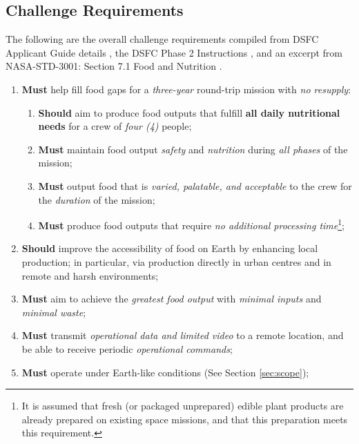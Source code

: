 \documentclass{../tex/report}
\begin{document}
\subsection{Challenge Requirements}
\label{sec:requirements}

The following are the overall challenge requirements compiled from DSFC Applicant Guide details \cite{applicantguide}, the DSFC Phase 2 Instructions \cite{dsfc-phase2}, and an excerpt from NASA-STD-3001: Section 7.1 Food and Nutrition \cite{nutrition}.

\begin{enumerate}[label=R\arabic*., ref=R\arabic*]
    \item \label{r:1} \textbf{Must} help fill food gaps for a \textit{three-year} round-trip mission with \textit{no resupply}:
    \begin{enumerate}[ref=R1\alph*]
        \item \label{r:1a} \textbf{Should} aim to produce food outputs that fulfill \textbf{all daily nutritional needs} for a crew of \textit{four (4)} people;
        \item \label{r:1b} \textbf{Must} maintain food output \textit{safety} and \textit{nutrition} during \textit{all phases} of the mission;
        \item \label{r:1c} \textbf{Must} output food that is \textit{varied, palatable, and acceptable} to the crew for the \textit{duration} of the mission;
        \item \label{r:1d} \textbf{Must} produce food outputs that require \textit{no additional processing time}\footnote{It is assumed that fresh (or packaged unprepared) edible plant products are already prepared on existing space missions, and that this preparation meets this requirement.};
    \end{enumerate}
    \item \label{r:2} \textbf{Should} improve the accessibility of food on Earth by enhancing local production; in particular, via production directly in urban centres and in remote and harsh environments;
    \item \label{r:3} \textbf{Must} aim to achieve the \textit{greatest food output} with \textit{minimal inputs} and \textit{minimal waste};
    \item \label{r:4} \textbf{Must} transmit \textit{operational data and limited video} to a remote location, and be able to receive periodic \textit{operational commands};
    \item \label{r:5} \textbf{Must} operate under Earth-like conditions (See Section \ref{sec:scope});
\end{enumerate}
\end{document}
